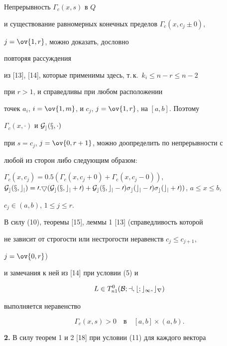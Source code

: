Непрерывность $\Gamma_c(x,s)$ в $Q$ 


и существование равномерных конечных пределов $\Gamma_c(x,c_j\pm 0)$, 


$j=\ov{1,r}$, можно доказать, дословно 


повторяя рассуждения 


из [13], [14], которые применимы здесь, т.\,к.~$k_i\le n-r\le n-2$ 


при $r>1$, и справедливы при любом расположении 


точек $a_i$, $i=\ov{1,m}$, и $c_j$, $j=\ov{1,r}$, на $[a,b]$. Поэтому 


$\Gamma_c(x,\cdot)$ и $\cal G_c(x,\cdot)$ 


при $s=c_j$, $j=\ov{0,r+1}$, можно доопределить по непрерывности с 


любой из сторон либо следующим образом: 


$\Gamma_c(x,c_j)=0.5(\Gamma_c(x,c_j+0)+ 


\Gamma_c(x,c_j-0))$, $\cal G_c(x,c_j)=0.5(\cal G_c(x,c_j+0)+\cal 


G_c(x,c_j-0)\sigma_c(c_j-0)\sigma_c(c_j+0))$, $a\le x\le b$, 


$c_j\in(a,b)$, $1\le j\le r$. 


 


В силу (10), теоремы [15], леммы 1 [13] (справедливость которой 


не зависит от строгости или нестрогости неравенств $c_j\le c_{j+1}$, 


$j=\ov{0,r}$) 


и замечания к ней из [14] при условии (5) и 


\begin{equation} 


L\in T^0_{n1}(\cal B;a,b;c_1,c_r) 


\end{equation} 


выполняется неравенство 


\begin{equation} 


\Gamma_c(x,s)>0\quad 


\text{в} 


\quad [a,b]\times(a,b). 


\end{equation} 


 


{\bf 2.} В силу теорем 1 и 2 [18] при условии (11) для каждого вектора 


